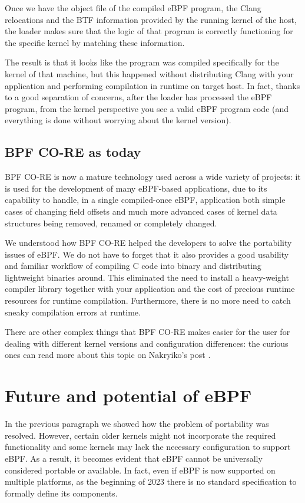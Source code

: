 Once we have the object file of the compiled eBPF program, the Clang relocations and the BTF information provided by the running kernel of the host, the loader makes sure that the logic of that program is correctly functioning for the specific kernel by matching these information.

The result is that it looks like the program was compiled specifically for the kernel of that machine, but this happened without distributing Clang with your application and performing compilation in runtime on target host.
In fact, thanks to a good separation of concerns, after the loader has processed the eBPF program, from the kernel perspective you see a valid eBPF program code (and everything is done without worrying about the kernel version).

\subsection{BPF CO-RE as today}

BPF CO-RE is now a mature technology used across a wide variety of projects: it is used for the development of many eBPF-based applications, due to its capability to handle, in a single compiled-once eBPF, application both simple cases of changing field offsets and much more advanced cases of kernel data structures being removed, renamed or completely changed.

We understood how BPF CO-RE helped the developers to solve the portability issues of eBPF.
We do not have to forget that it also provides a good usability and familiar workflow of compiling C code into binary and distributing lightweight binaries around. 
This eliminated the need to install a heavy-weight compiler library together with your application and the cost of precious runtime resources for runtime compilation. 
Furthermore, there is no more need to catch sneaky compilation errors at runtime.

There are other complex things that BPF CO-RE makes easier for the user for dealing with different kernel versions and configuration differences: the curious ones can read more about this topic on Nakryiko's post \cite{ANCOREPost}.

\section{Future and potential of eBPF}

In the previous paragraph we showed how the problem of portability was resolved.
However, certain older kernels might not incorporate the required functionality and some kernels may lack the necessary configuration to support eBPF. 
As a result, it becomes evident that eBPF cannot be universally considered portable or available.
In fact, even if eBPF is now supported on multiple platforms, as the beginning of 2023 there is no standard specification to formally define its components. 

